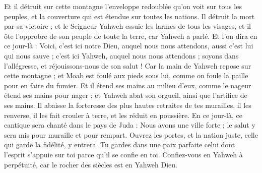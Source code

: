 \begin{multicols}{2}
Et il détruit sur cette montagne l'enveloppe redoublée qu'on voit sur tous les peuples, et la couverture qui est étendue sur toutes les nations.
Il détruit la mort par sa victoire ; et le Seigneur Yahweh essuie les larmes de tous les visages, et il ôte l'opprobre de son peuple de toute la terre, car Yahweh a parlé.
Et l'on dira en ce jour-là : Voici, c'est ici notre Dieu, auquel nous nous attendons, aussi c'est lui qui nous sauve ; c'est ici Yahweh, auquel nous nous attendons ; soyons dans l'allégresse, et réjouissons-nous de son salut !
Car la main de Yahweh repose sur cette montagne ; et Moab est foulé aux pieds sous lui, comme on foule la paille pour en faire du fumier.
Et il étend ses mains au milieu d'eux, comme le nageur étend ses mains pour nager ; et Yahweh abat son orgueil, ainsi que l'artifice de ses mains.
Il abaisse la forteresse des plus hautes retraites de tes murailles, il les renverse, il les fait crouler à terre, et les réduit en poussière.
\VerseOne{}En ce jour-là, ce cantique sera chanté dans le pays de Juda : Nous avons une ville forte ; le salut y sera mis pour muraille et pour rempart.
Ouvrez les portes, et la nation juste, celle qui garde la fidélité, y entrera.
Tu gardes dans une paix parfaite celui dont l'esprit s'appuie sur toi parce qu'il se confie en toi.
Confiez-vous en Yahweh à perpétuité, car le rocher  des siècles est en Yahweh Dieu.

\end{multicols}
